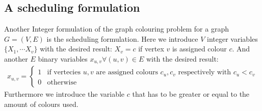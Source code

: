 \subsection{A scheduling formulation}
Another Integer formulation of the graph colouring problem for a graph $G=(V,E)$ is the scheduling formulation. Here we introduce $V$ integer variables $\{X_1, \cdots X_v\}$ with the desired result: $X_v = c$ if vertex $v$ is assigned colour $c$. And another $E$ binary variables $x_{u,v} \forall (u,v)\in E$ with the desired result:
\begin{align}
x_{u,v} = \left\{
\begin{array}{ll}
1 & \text{if vertecies }u,v \text{ are assigned colours $c_u,c_v$ respectively with } c_u < c_v \\ 0 & \text{otherwise}
\end{array}\right.
\end{align}
Furthermore we introduce the variable $c$ that has to be greater or equal to the amount of colours used.
